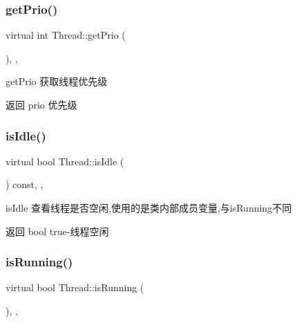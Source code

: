 \subsubsection{\texorpdfstring{get\+Prio()}{getPrio()}}
{\footnotesize\ttfamily virtual int Thread\+::get\+Prio (\begin{DoxyParamCaption}{ }\end{DoxyParamCaption})\hspace{0.3cm}{\ttfamily [inline]}, {\ttfamily [final]}, {\ttfamily [virtual]}}



get\+Prio 获取线程优先级 

\begin{DoxyReturn}{返回}
prio 优先级 
\end{DoxyReturn}
\mbox{\label{classThread_acb6c590deecea4778a855459f080060a}} 
\subsubsection{\texorpdfstring{is\+Idle()}{isIdle()}}
{\footnotesize\ttfamily virtual bool Thread\+::is\+Idle (\begin{DoxyParamCaption}{ }\end{DoxyParamCaption}) const\hspace{0.3cm}{\ttfamily [inline]}, {\ttfamily [final]}, {\ttfamily [virtual]}}



is\+Idle 查看线程是否空闲,使用的是类内部成员变量,与is\+Running不同 

\begin{DoxyReturn}{返回}
bool true-\/线程空闲 
\end{DoxyReturn}
\mbox{\label{classThread_ab4c718f3ca4aa7514c7e89e38f9da894}} 
\subsubsection{\texorpdfstring{is\+Running()}{isRunning()}}
{\footnotesize\ttfamily virtual bool Thread\+::is\+Running (\begin{DoxyParamCaption}{ }\end{DoxyParamCaption})\hspace{0.3cm}{\ttfamily [inline]}, {\ttfamily [final]}, {\ttfamily [virtual]}}



